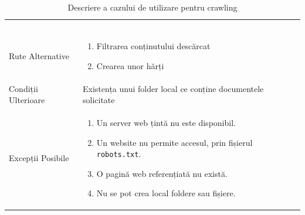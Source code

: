 \documentclass[12pt]{article}
\begin{document}
\begin{table}[H]
\begin{tabular}{ |p{0.25\linewidth} | p{0.75\linewidth}| }
\begin{enumerate}
                      \end{enumerate} \\
        Rute Alternative & \begin{enumerate}
                               \item Filtrarea conținutului descărcat
                               \item Crearea unor hărți
                           \end{enumerate} \\
        Condiții Ulterioare & Existența unui folder local ce conține documentele solicitate \\
        Excepții Posibile & \begin{enumerate}
                                \item Un server web țintă nu este disponibil.
                                \item Un website nu permite accesul, prin fișierul \texttt{robots.txt}.
                                \item O pagină web referențiată nu există.
                                \item Nu se pot crea local foldere sau fișiere.
                            \end{enumerate} \\
        \hline
    \end{tabular}
    \caption{Descriere a cazului de utilizare pentru crawling}
    \label{table:1}
\end{table}

\newpage
\end{document}

